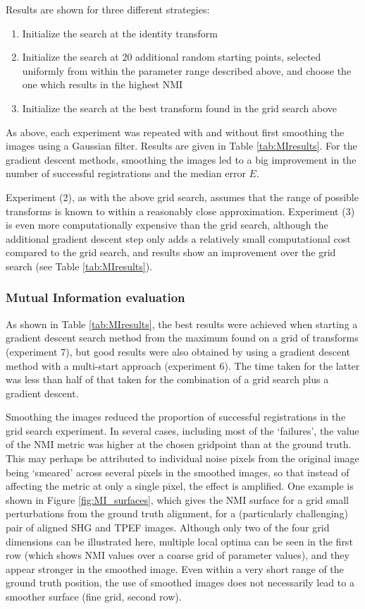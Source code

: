 \documentclass{report}
\begin{document}
Results are shown for three different strategies: 
\begin{enumerate}
    \item Initialize the search at the identity transform
    \item Initialize the search at 20 additional random starting points, selected uniformly from within the parameter range described above, and choose the one which results in the highest NMI
    \item Initialize the search at the best transform found in the grid search above
\end{enumerate}
As above, each experiment was repeated with and without first smoothing the images using a Gaussian filter. Results are given in Table \ref{tab:MIresults}. For the gradient descent methods, smoothing the images led to a big improvement in the number of successful registrations and the median error $E$.

Experiment (2), as with the above grid search, assumes that the range of possible transforms is known to within a reasonably close approximation. Experiment (3) is even more computationally expensive than the grid search, although the additional gradient descent step only adds a relatively small computational cost compared to the grid search, and results show an improvement over the grid search (see Table \ref{tab:MIresults}).

\subsubsection{Mutual Information evaluation}
As shown in Table \ref{tab:MIresults}, the best results were achieved when starting a gradient descent search method from the maximum found on a grid of transforms (experiment 7), but good results were also obtained by using a gradient descent method with a multi-start approach (experiment 6). The time taken for the latter was less than half of that taken for the combination of a grid search plus a gradient descent.

Smoothing the images reduced the proportion of successful registrations in the grid search experiment. In several cases, including most of the `failures', the value of the NMI metric was higher at the chosen gridpoint than at the ground truth. This may perhaps be attributed to individual noise pixels from the original image being `smeared' across several pixels in the smoothed images, so that instead of affecting the metric at only a single pixel, the effect is amplified. One example is shown in Figure \ref{fig:MI_surfaces}, which gives the NMI surface for a grid small perturbations from the ground truth alignment, for a (particularly challenging) pair of aligned SHG and TPEF images. Although only two of the four grid dimensions can be illustrated here, multiple local optima can be seen in the first row (which shows NMI values over a coarse grid of parameter values), and they appear stronger in the smoothed image. Even within a very short range of the ground truth position, the use of smoothed images does not necessarily lead to a smoother surface (fine grid, second row).
\end{document}
